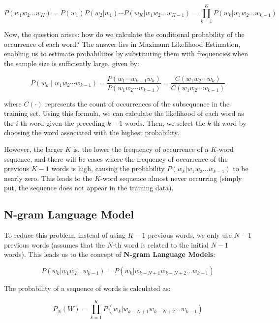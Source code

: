\begin{equation}
P(w_1 w_2 \ldots w_K) = P(w_1) P(w_2 | w_1) \cdots P(w_K | w_1 w_2 \ldots w_{K-1}) = \prod_{k=1}^{K} P(w_k | w_1 w_2 \ldots w_{k-1})
\end{equation}

Now, the question arises: how do we calculate the conditional probability of the occurrence of each word? The answer lies in Maximum Likelihood Estimation, enabling us to estimate probabilities by substituting them with frequencies when the sample size is sufficiently large, given by:

\begin{equation}
P(w_k \mid w_1 w_2 \cdots w_{k-1}) = \frac{P(w_1 \cdots w_{k-1} w_k)}{P(w_1 w_2 \cdots w_{k-1})} = \frac{C(w_1 w_2 \cdots w_k)}{C(w_1 w_2 \cdots w_{k-1})}
\end{equation}

\noindent where $C(\cdot)$ represents the count of occurrences of the subsequence in the training set. Using this formula, we can calculate the likelihood of each word as the $i$-th word given the preceding $k - 1$ words. Then, we select the $k$-th word by choosing the word associated with the highest probability. 

However, the larger $K$ is, the lower the frequency of occurrence of a $K$-word sequence, and there will be cases where the frequency of occurrence of the previous $K - 1$ words is high, causing the probability $P(w_k | w_1 w_2 \ldots w_{k-1})$ to be nearly zero. This leads to the $K$-word sequence almost never occurring (simply put, the sequence does not appear in the training data).\\

\subsection{N-gram Language Model}

To reduce this problem, instead of using $K - 1$ previous words, we only use $N - 1$ previous words (assumes that the $N$-th word is related to the initial $N - 1$ words). This leads us to the concept of \textbf{N-gram Language Models}:

\begin{equation}
    P(w_k | w_1 w_2 \ldots w_{k-1}) = P(w_k | w_{k-N+1} w_{k-N+2} \ldots w_{k-1})
\end{equation}

The probability of a sequence of words is calculated as:

\begin{equation}
    P_N(W) = \prod_{k=1}^{K} P(w_k | w_{k-N+1} w_{k-N+2} \ldots w_{k-1})
\end{equation}

